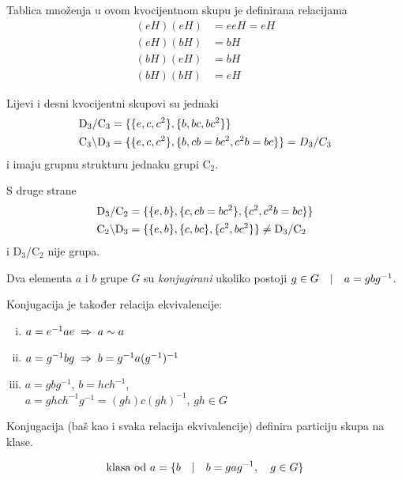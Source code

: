 \begin{primjer}[D$_{3}$/C$_3$]
Tablica množenja u ovom kvocijentnom skupu je definirana relacijama
\begin{align}
(eH)(eH) &= ee H = eH \\
(eH)(bH) &= bH  \\
(bH)(eH) &= bH  \\
(bH)(bH) &= eH 
\end{align}

Lijevi i desni kvocijentni skupovi su jednaki
\begin{align*}
{\rm D}_{3}/{\rm C}_3 &= \{\{e,c,c^2\}, \{b, bc, bc^2\}\} \\
{\rm C}_3\backslash{\rm D}_{3} &= \{\{e,c,c^2\}, \{b, cb=bc^2, c^2b=bc\}\}
    = D_{3}/C_3
\end{align*}
i imaju grupnu strukturu jednaku grupi C$_2$.

\end{primjer}

S druge strane
\begin{align*}
{\rm D}_{3}/{\rm C}_2 &= \{\{e,b\}, \{c, cb=bc^2\}, \{c^2, c^2b=bc\}\} \\
{\rm C}_2\backslash{\rm D}_{3} &= \{\{e,b\}, \{c, bc\}, \{c^2, bc^2\}\}
    \neq {\rm D}_{3}/{\rm C}_2
\end{align*}
i D$_{3}$/C$_2$ nije grupa.


\begin{definicija}
Dva elementa $a$ i $b$ grupe $G$ su \emph{konjugirani} ukoliko
postoji $g\in G \quad | \quad a=gbg^{-1}$.
\end{definicija}



Konjugacija je također relacija ekvivalencije:
\begin{enumerate}[(i)]

\item $a=e^{-1} a e  \;\Rightarrow\; a\sim a$
\item $a=g^{-1} b g  \;\Rightarrow\;  b= g^{-1} a (g^{-1})^{-1}$
\item $a=g b g^{-1}$, $b=hch^{-1}$, \\
         $a=ghch^{-1}g^{-1}=(gh)c(gh)^{-1}$, $gh\in G$
  
\end{enumerate}


Konjugacija (baš kao i svaka relacija ekvivalencije) definira
particiju skupa na klase.

\begin{displaymath}
   \text{klasa od $a$} = \{ b \quad | \quad b=gag^{-1},\quad g\in G\}
\end{displaymath}

